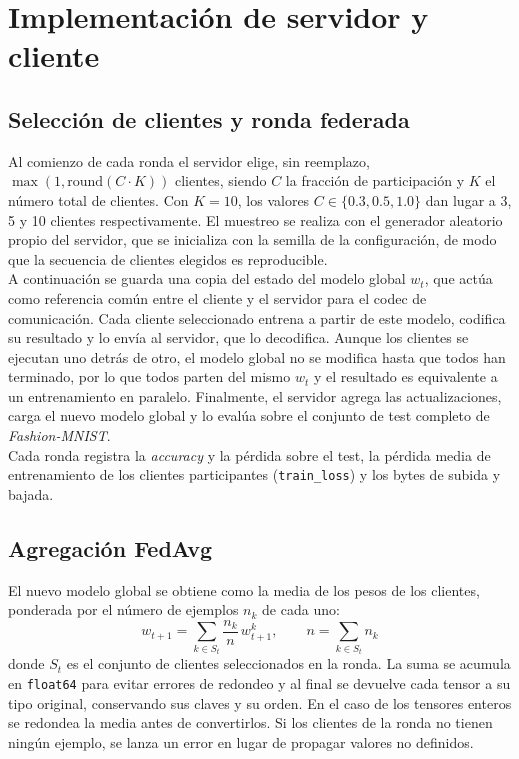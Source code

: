 \section{Implementación de servidor y cliente}

\subsection{Selección de clientes y ronda federada}
Al comienzo de cada ronda el servidor elige, sin reemplazo, $\max(1, \text{round}(C \cdot K))$ clientes, siendo $C$
la fracción de participación y $K$ el número total de clientes. Con $K=10$, los valores $C \in \{0.3, 0.5, 1.0\}$
dan lugar a 3, 5 y 10 clientes respectivamente. El muestreo se realiza con el generador aleatorio propio del
servidor, que se inicializa con la semilla de la configuración, de modo que la secuencia de clientes elegidos es
reproducible.
\\

A continuación se guarda una copia del estado del modelo global $w_t$, que actúa como referencia común entre
el cliente y el servidor para el codec de comunicación. Cada cliente seleccionado entrena a partir de
este modelo, codifica su resultado y lo envía al servidor, que lo decodifica. Aunque los clientes se ejecutan uno
detrás de otro, el modelo global no se modifica hasta que todos han terminado, por lo que todos parten del mismo
$w_t$ y el resultado es equivalente a un entrenamiento en paralelo. Finalmente, el servidor agrega las
actualizaciones, carga el nuevo modelo global y lo evalúa sobre el conjunto de test completo de \textit{Fashion-MNIST}.
\\

Cada ronda registra la \textit{accuracy} y la pérdida sobre el test, la pérdida media de entrenamiento de los
clientes participantes (\texttt{train\_loss}) y los bytes de subida y bajada.

\subsection{Agregación FedAvg}
El nuevo modelo global se obtiene como la media de los pesos de los clientes, ponderada por el número de ejemplos
$n_k$ de cada uno:
\[
w_{t+1} = \sum_{k \in S_t} \frac{n_k}{n} \, w_{t+1}^{k}, \qquad n = \sum_{k \in S_t} n_k
\]
donde $S_t$ es el conjunto de clientes seleccionados en la ronda. La suma se acumula en \texttt{float64} para evitar
errores de redondeo y al final se devuelve cada tensor a su tipo original, conservando sus claves y su orden. En
el caso de los tensores enteros se redondea la media antes de convertirlos. Si los clientes de la ronda no tienen
ningún ejemplo, se lanza un error en lugar de propagar valores no definidos.

